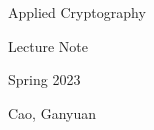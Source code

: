 \documentclass[11pt,a4paper]{article}
\begin{document}
\newpage
\begin{center}
\sc
\huge{Applied Cryptography} 

\vspace{0.5cm}
\Large{Lecture Note}

\vspace{0.5cm}
\large{Spring 2023}

\vspace{0.5cm}
\large{Cao, Ganyuan}
\vspace{1cm}
\end{center}

\tableofcontents






\end{document}

